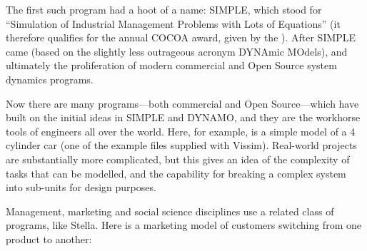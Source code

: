 The first such program had a hoot of a name: SIMPLE, which stood for
``Simulation of Industrial Management Problems with Lots of Equations''
(it therefore qualifies for the annual COCOA award, given by the
). After
SIMPLE came
(based on the slightly less outrageous acronym DYNAmic MOdels), and
ultimately the proliferation of modern commercial and Open Source
system dynamics programs. 

Now there are many programs---both commercial and Open Source---which
have built on the initial ideas in SIMPLE and DYNAMO, and they are the
workhorse tools of engineers all over the world. Here, for example, is
a simple model of a 4 cylinder car (one of the example files supplied
with Vissim). Real-world projects are substantially more complicated,
but this gives an idea of the complexity of tasks that can be
modelled, and the capability for breaking a complex system into
sub-units for design purposes. 


Management, marketing and social science disciplines use a related
class of programs, like Stella. Here is a marketing model of customers
switching from one product to another: 



